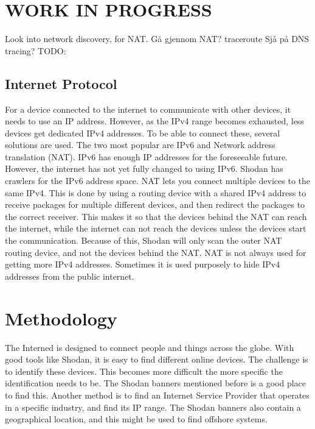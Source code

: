\section{WORK IN PROGRESS} \label{sec:new}
Look into network discovery, for NAT.
Gå gjennom NAT?
traceroute 
Sjå på DNS tracing?
TODO: 



\subsection{Internet Protocol}
For a device connected to the internet to communicate with other devices, it needs to use an IP address. However, as the IPv4 range becomes exhausted, less devices get dedicated IPv4 addresses. To be able to connect these, several solutions are used. The two most popular are IPv6 and Network address translation (NAT).
IPv6 has enough IP addresses for the foreseeable future. However, the internet has not yet fully changed to using IPv6. Shodan has crawlers for the IPv6 address space.
NAT lets you connect multiple devices to the same IPv4. This is done by using a routing device with a shared IPv4 address to receive packages for multiple different devices, and then redirect the packages to the correct receiver. This makes it so that the devices behind the NAT can reach the internet, while the internet can not reach the devices unless the devices start the communication. Because of this, Shodan will only scan the outer NAT routing device, and not the devices behind the NAT. NAT is not always used for getting more IPv4 addresses. Sometimes it is used purposely to hide IPv4 addresses from the public internet.


\section{Methodology}
The Interned is designed to connect people and things across the globe. With good tools like Shodan, it is easy to find different online devices. The challenge is to identify these devices. This becomes more difficult the more specific the identification needs to be. The Shodan banners mentioned before is a good place to find this. Another method is to find an Internet Service Provider that operates in a specific industry, and find its IP range. The Shodan banners also contain a geographical location, and this might be used to find offshore systems.

